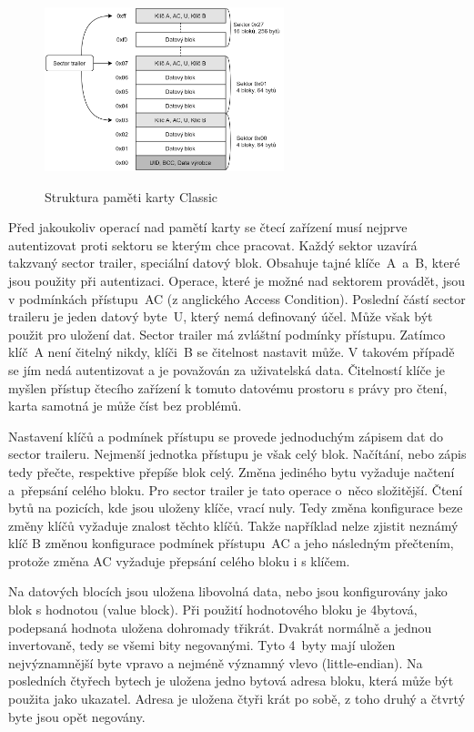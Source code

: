 \begin{figure}[ht]\centering
  \centering
  \hspace*{-0.07\linewidth}
  \includegraphics[width=0.6\linewidth,height=180px]{obrazky-figures/MemoryStructure.png}\\[1pt]  
  \caption{Struktura paměti karty Classic\cite{PracticalAttackOnMIFARE}}    
  \label{obrazekStrukturaPametiKarty}
\end{figure}

\par
Před jakoukoliv operací nad pamětí karty se čtecí zařízení musí nejprve autentizovat proti sektoru se kterým chce pracovat. Každý sektor uzavírá takzvaný sector trailer, speciální datový blok. Obsahuje tajné klíče~A~a~B, které jsou použity při autentizaci. Operace, které je možné nad sektorem provádět, jsou v podmínkách přístupu~AC (z anglického Access Condition). Poslední částí sector traileru je jeden datový byte~U, který nemá definovaný účel. Může však být použit pro uložení dat. Sector trailer má zvláštní  podmínky přístupu. Zatímco klíč~A není čitelný nikdy, klíči~B se čitelnost nastavit může. V takovém případě se jím nedá autentizovat a je považován za uživatelská data. Čitelností klíče je myšlen přístup čtecího zařízení k tomuto datovému prostoru s právy pro čtení, karta samotná je může číst bez problémů\cite{PracticalAttackOnMIFARE}. \par
Nastavení klíčů a podmínek přístupu se provede jednoduchým zápisem dat do sector traileru. Nejmenší jednotka přístupu je však celý blok. Načítání, nebo zápis tedy přečte, respektive přepíše blok celý. Změna jediného bytu vyžaduje načtení a~přepsání celého bloku. Pro sector trailer je tato operace o~něco složitější. Čtení bytů na pozicích, kde jsou uloženy klíče, vrací nuly. Tedy změna konfigurace beze změny klíčů vyžaduje znalost těchto klíčů. Takže například nelze zjistit neznámý klíč B změnou konfigurace podmínek přístupu~AC a jeho následným přečtením, protože změna AC vyžaduje přepsání celého bloku i s klíčem\cite{makingTheBestOf}.
\par
Na datových blocích jsou uložena libovolná data, nebo jsou konfigurovány jako blok s hodnotou (value block). Při použití hodnotového bloku je 4bytová, podepsaná hodnota uložena dohromady třikrát. Dvakrát normálně a jednou invertovaně, tedy se všemi bity negovanými. Tyto 4~byty mají uložen nejvýznamnější byte vpravo a nejméně významný vlevo ({little-endian}). Na posledních čtyřech bytech je uložena jedno bytová adresa bloku, která může být použita jako ukazatel. Adresa je uložena čtyři krát po sobě, z toho druhý a čtvrtý byte jsou opět negovány\cite{PracticalAttackOnMIFARE}.

